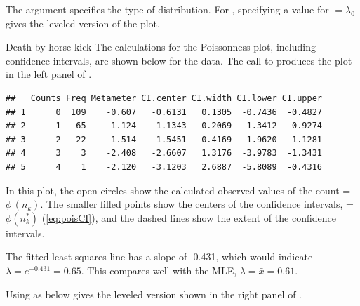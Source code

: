\documentclass[11pt]{book}
\renewenvironment{knitrout}{\small\renewcommand{\baselinestretch}{.85}}{} %
\begin{document}
The  argument specifies the type of distribution. For ,
specifying a value for  $=\lambda_0$ gives the leveled version of the
plot.

\begin{Example}[horsekick4]{Death by horse kick}
The calculations for the Poissonness plot, including confidence
intervals, are shown below for the  data.  The 
call to 
produces the plot in the left panel of
.  

\begin{knitrout}
\color{fgcolor}\begin{kframe}
\begin{alltt}
\hlstd{(}\hlstd{,} \hlstd{=}\hlstd{)}
 \hlkwb{<-}   \hlstd{=} \hlstd{,}
  \hlstd{=}\hlstd{,} \hlstd{=}\hlstd{)}
 \hlstd{=}\hlstd{)}
\end{alltt}
\begin{verbatim}
##   Counts Freq Metameter CI.center CI.width CI.lower CI.upper
## 1      0  109    -0.607   -0.6131   0.1305  -0.7436  -0.4827
## 2      1   65    -1.124   -1.1343   0.2069  -1.3412  -0.9274
## 3      2   22    -1.514   -1.5451   0.4169  -1.9620  -1.1281
## 4      3    3    -2.408   -2.6607   1.3176  -3.9783  -1.3431
## 5      4    1    -2.120   -3.1203   2.6887  -5.8089  -0.4316
\end{verbatim}
\end{kframe}
\end{knitrout}
In this plot, the open circles show the calculated
observed values of the count  = $\phi \,  ( n_k )$.
The smaller filled points show the centers of the confidence intervals,
 = $\phi \left( n_k^{*}\right)$ (\eqref{eq:poisCI}),
and the dashed lines show the extent of the confidence intervals.

The fitted least squares line has a slope of -0.431, which would
indicate $\lambda = e^{-0.431} = 0.65$.  This compares well with the MLE,
$\lambda = \bar{x} = 0.61$.

Using  as below gives the leveled version shown in 
the right panel of .
\begin{knitrout}
\color{fgcolor}\begin{kframe}
\begin{alltt}
  \hlstd{=} \hlstd{,}  \hlstd{=} \hlstd{,}
  \hlstd{=}\hlstd{,} \hlstd{=}\hlstd{)}
\end{alltt}
\end{kframe}
\end{knitrout}


\end{Example}
\end{document}
